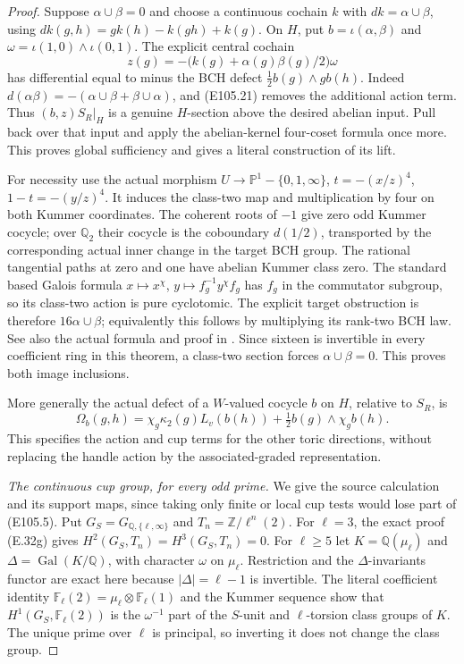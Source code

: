 \begin{proof}
Suppose $\alpha\cup\beta=0$ and choose a continuous
cochain $k$ with $dk=\alpha\cup\beta$, using
$dk(g,h)=gk(h)-k(gh)+k(g)$.
On $H$, put $b=\iota(\alpha,\beta)$ and
$\omega=\iota(1,0)\wedge\iota(0,1)$.
The explicit central cochain
\[
           z(g)=-\bigl(k(g)+\alpha(g)\beta(g)/2\bigr)\omega
 \tag{E105.22}
\]
has differential equal to minus the BCH defect
$\tfrac12 b(g)\wedge g b(h)$.
Indeed $d(\alpha\beta)=-(\alpha\cup\beta+\beta\cup\alpha)$,
and (E105.21) removes the additional action term.
Thus $(b,z)S_R|_H$ is a genuine $H$-section above the
desired abelian input.  Pull back over that input and
apply the abelian-kernel four-coset formula once more.
This proves global sufficiency and gives a literal
construction of its lift.

For necessity use the actual morphism
$U\to\mathbb P^1-\{0,1,\infty\}$,
$t=-(x/z)^4$, $1-t=-(y/z)^4$.
It induces the class-two map and multiplication by four
on both Kummer coordinates.
The coherent roots of $-1$ give zero odd Kummer cocycle;
over $\mathbb Q_2$ their cocycle is the coboundary
$d(1/2)$, transported by the corresponding actual
inner change in the target BCH group.
The rational tangential paths at zero and one have
abelian Kummer class zero.  The standard based Galois
formula $x\mapsto x^\chi$, $y\mapsto f_g^{-1}y^\chi f_g$
has $f_g$ in the commutator subgroup, so its class-two
action is pure cyclotomic.  The explicit target
obstruction is therefore $16\alpha\cup\beta$; equivalently
this follows by multiplying its rank-two BCH law.
See also the actual formula and proof in
\cite[Proposition7, \S12.4.5]{E_Wickelgren}.
Since sixteen is invertible in every coefficient ring
in this theorem, a class-two section forces
$\alpha\cup\beta=0$.  This proves both image inclusions.

More generally the actual defect of a $W$-valued cocycle
$b$ on $H$, relative to $S_R$, is
\[
 \Omega_b(g,h)=\chi_g\kappa_2(g)L_v(b(h))
                     +\tfrac12 b(g)\wedge\chi_g b(h).
 \tag{E105.23}
\]
This specifies the action and cup terms for the other
toric directions, without replacing the handle action
by the associated-graded representation.

\emph{The continuous cup group, for every odd prime.}
We give the source calculation and its support maps,
since taking only finite or local cup tests would lose
part of (E105.5).
Put $G_S=G_{\mathbb Q,\{\ell,\infty\}}$ and
$T_n=\mathbb Z/\ell^n(2)$.
For $\ell=3$, the exact proof (E.32g) gives
$H^2(G_S,T_n)=H^3(G_S,T_n)=0$.
For $\ell\ge5$ let $K=\mathbb Q(\mu_\ell)$ and
$\Delta=\operatorname{Gal}(K/\mathbb Q)$, with character
$\omega$ on $\mu_\ell$.
Restriction and the $\Delta$-invariants functor are exact
here because $|\Delta|=\ell-1$ is invertible.
The literal coefficient identity
$\mathbb F_\ell(2)=\mu_\ell\otimes\mathbb F_\ell(1)$
and the Kummer sequence show that
$H^1(G_S,\mathbb F_\ell(2))$ is the $\omega^{-1}$ part
of the $S$-unit and $\ell$-torsion class groups of $K$.
The unique prime over $\ell$ is principal, so inverting it
does not change the class group.


\end{proof}
